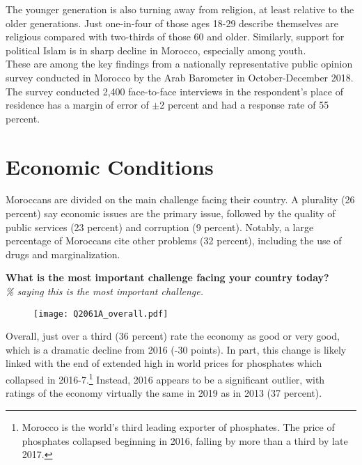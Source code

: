 \documentclass[12pt]{article}
\begin{document}
	\noindent The younger generation is also turning away from religion, at least relative to the older generations. Just one-in-four of those ages 18-29 describe themselves are religious compared with two-thirds of those 60 and older. Similarly, support for political Islam is in sharp decline in Morocco, especially among youth.\\
	
	\noindent These are among the key findings from a nationally representative public opinion survey conducted in Morocco by the Arab Barometer in October-December 2018. The survey conducted 2,400 face-to-face interviews in the respondent's place of residence has a margin of error of $\pm$2 percent and had a response rate of 55 percent.
	\pagebreak

\section*{Economic Conditions}

	Moroccans are divided on the main challenge facing their country. A plurality (26 percent) say economic issues are the primary issue, followed by the quality of public services (23 percent) and corruption (9 percent). Notably, a large percentage of Moroccans cite other problems (32 percent), including the use of drugs and marginalization.\\
	
	\begin{center}
	{\textbf{What is the most important challenge facing your country today?}}\\
	\emph{\% saying this is the most important challenge.}
	\begin{figure}[H]
		\centering
		\texttt{[image: Q2061A\_overall.pdf]}
	\end{figure}
	\end{center}

	\noindent Overall, just over a third (36 percent) rate the economy as good or very good, which is a dramatic decline from 2016 (-30 points). In part, this change is likely linked with the end of extended high in world prices for phosphates which collapsed in 2016-7.\footnote{\color{gray}Morocco is the world's third leading exporter of phosphates. The price of phosphates collapsed beginning in 2016, falling by more than a third by late 2017.} Instead, 2016 appears to be a significant outlier, with ratings of the economy virtually the same in 2019 as in 2013 (37 percent).
	
\end{document}
